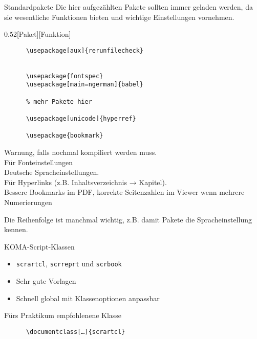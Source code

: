 \begin{frame}[fragile]{Standardpakete}
  Die hier aufgezählten Pakete sollten immer geladen werden, da sie wesentliche Funktionen bieten und wichtige Einstellungen vornehmen.
  \vspace{-1em}
  \begin{CodeExplanation}{0.52}[Paket][Funktion]
    \begin{lstlisting}
      \usepackage[aux]{rerunfilecheck}


      \usepackage{fontspec}
      \usepackage[main=ngerman]{babel}

      % mehr Pakete hier

      \usepackage[unicode]{hyperref}

      \usepackage{bookmark}
    \end{lstlisting}
  \Explanation
    Warnung, falls nochmal kompiliert werden muss. \\[\baselineskip]
    Für Fonteinstellungen \\
    Deutsche Spracheinstellungen. \\[3\baselineskip]
    Für Hyperlinks (z.B. Inhaltsverzeichnis → Kapitel). \\
    Bessere Bookmarks im PDF,
    korrekte Seitenzahlen im Viewer wenn mehrere Numerierungen
  \end{CodeExplanation}
  Die Reihenfolge ist manchmal wichtig, z.B. damit Pakete die Spracheinstellung kennen.
\end{frame}

\begin{frame}[fragile]{
  KOMA-Script-Klassen
  \hfill
}
  \begin{itemize}
    \item \texttt{scrartcl}, \texttt{scrreprt} und \texttt{scrbook}
    \item Sehr gute Vorlagen
    \item Schnell global mit Klassenoptionen anpassbar
  \end{itemize}
  \begin{block}{Fürs Praktikum empfohlenene Klasse}
    \begin{lstlisting}
      \documentclass[…]{scrartcl}
    \end{lstlisting}
  \end{block}
\end{frame}

